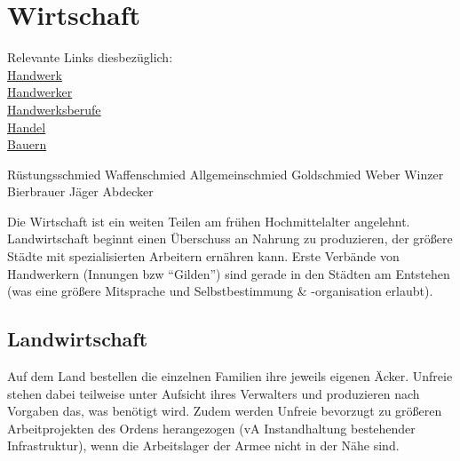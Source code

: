 \chapter{Wirtschaft}
Relevante Links diesbezüglich: \\
\href{https://www.leben-im-mittelalter.net/kultur-im-mittelalter/wirtschaft/handwerk.html}{Handwerk} \\
\href{https://www.leben-im-mittelalter.net/alltag-im-mittelalter/arbeit-und-berufe/handwerker.html}{Handwerker} \\
\href{https://www.leben-im-mittelalter.net/alltag-im-mittelalter/arbeit-und-berufe/handwerker/handwerksberufe.html}{Handwerksberufe} \\
\href{https://www.leben-im-mittelalter.net/kultur-im-mittelalter/wirtschaft/handel.html}{Handel}\\
\href{https://www.leben-im-mittelalter.net/alltag-im-mittelalter/arbeit-und-berufe/bauern.html}{Bauern}\\


\begin{outline}
	\1 Rüstungsschmied
	\1 Waffenschmied
	\1 Allgemeinschmied
	\1 Goldschmied
	\1 Weber
	\1 Winzer
	\1 Bierbrauer
	\1 Jäger
	\1 Abdecker
\end{outline}

Die Wirtschaft ist ein weiten Teilen am frühen Hochmittelalter angelehnt. 
Landwirtschaft beginnt einen Überschuss an Nahrung zu produzieren, der größere Städte mit spezialisierten Arbeitern ernähren kann. 
Erste Verbände von Handwerkern (Innungen bzw ``Gilden'') sind gerade in den Städten am Entstehen (was eine größere Mitsprache und Selbstbestimmung \& -organisation erlaubt).\\


\section{Landwirtschaft}
Auf dem Land bestellen die einzelnen Familien ihre jeweils eigenen Äcker. 
Unfreie stehen dabei teilweise unter Aufsicht ihres Verwalters und produzieren nach Vorgaben das, was benötigt wird. 
Zudem werden Unfreie bevorzugt zu größeren Arbeitprojekten des Ordens herangezogen (vA Instandhaltung bestehender Infrastruktur), wenn die Arbeitslager der Armee nicht in der Nähe sind.

